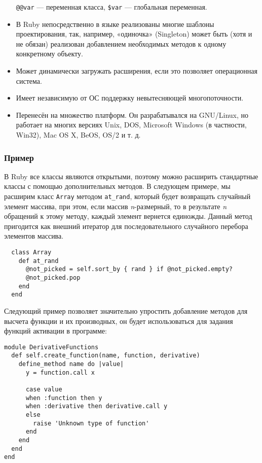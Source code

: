 \documentclass[a4paper,14pt]{extarticle}
\begin{document}
\begin{itemize}
        \texttt{@@var} — переменная класса, \texttt{\$var} — глобальная
        переменная.
  \item В Ruby непосредственно в языке реализованы многие шаблоны
        проектирования, так, например, «одиночка» (Singleton) может быть (хотя и
        не обязан) реализован добавлением необходимых методов к одному
        конкретному объекту.
  \item Может динамически загружать расширения, если это позволяет операционная
        система.
  \item Имеет независимую от ОС поддержку невытесняющей многопоточности.
  \item Перенесён на множество платформ. Он разрабатывался на GNU/Linux, но
        работает на многих версиях Unix, DOS, Microsoft Windows (в частности,
        Win32), Mac OS X, BeOS, OS/2 и т. д.
\end{itemize}

\subsubsection{Пример}
В Ruby все классы являются открытыми, поэтому можно расширить стандартные классы
с помощью дополнительных методов. В следующем примере, мы расширим класс
\texttt{Array} методом \texttt{at\_rand}, который будет возвращать случайный
элемент массива, при этом, если массив \emph{n}-размерный, то в результате
\emph{n} обращений к этому методу, каждый элемент вернется единожды. Данный
метод пригодится как внешний итератор для последовательного случайного перебора
элементов массива.

\begin{verbatim}
  class Array
    def at_rand
      @not_picked = self.sort_by { rand } if @not_picked.empty?
      @not_picked.pop
    end
  end  
\end{verbatim}

Следующий пример позволяет значительно упростить добавление методов для высчета
функции и их производных, он будет использоваться для задания функций активации
в программе: 

\begin{verbatim}
module DerivativeFunctions
  def self.create_function(name, function, derivative)
    define_method name do |value|
      y = function.call x
    
      case value
      when :function then y
      when :derivative then derivative.call y
      else
        raise 'Unknown type of function'
      end
    end
  end
end
\end{verbatim}
\end{document}
